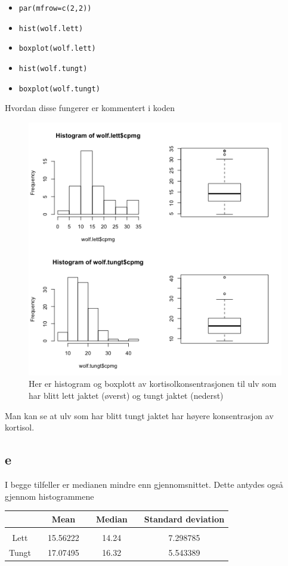 \begin{itemize}
    \item \texttt{par(mfrow=c(2,2))}
    \item \texttt{hist(wolf.lett)}
    \item \texttt{boxplot(wolf.lett)}
    \item \texttt{hist(wolf.tungt)}
    \item \texttt{boxplot(wolf.tungt)}
\end{itemize}
Hvordan disse fungerer er kommentert i koden
\begin{figure}[H]
        \centering
        \includegraphics[width=0.9\linewidth]{wolf_sammenlign.pdf}
        \caption{Her er histogram og boxplott av kortisolkonsentrasjonen til ulv som har blitt lett jaktet (øverst) og tungt jaktet (nederst)}
        \label{fig:sammenlign}
\end{figure}
Man kan se at ulv som har blitt tungt jaktet har høyere konsentrasjon av kortisol.

\subsection*{e}

I begge tilfeller er medianen mindre enn gjennomsnittet. Dette antydes også gjennom histogrammene

\begin{center}
\label{tab:mean_median_standard}
\begin{tabularx}{\textwidth}{c X c X c X c }
    \hline
    \hline
         && Mean && Median && Standard deviation \\
    \hline
    \\
        Lett    &&     15.56222      &&      14.24      &&     7.298785       \\
        Tungt   &&     17.07495      &&      16.32      &&      5.543389       \\
    \hline
\end{tabularx}
\end{center}


